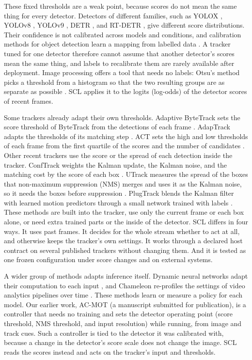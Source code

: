 \documentclass[pdflatex,referee,sn-mathphys-num]{sn-jnl}
\newcommand{\scl}{SCL}
\begin{document}
These fixed thresholds are a weak point, because scores do not mean the same
thing for every detector. Detectors of different families, such as YOLOX
\cite{ge2021yolox}, YOLOv8 \cite{jocher2023yolov8}, YOLOv9
\cite{wang2024yolov9}, DETR \cite{carion2020detr}, and RT-DETR
\cite{zhao2024rtdetr}, give different score distributions. Their confidence
is not calibrated across models and conditions, and calibration methods for
object detection learn a mapping from labelled data
\cite{kuppers2020detcalib}. A tracker tuned for one detector therefore cannot
assume that another detector's scores mean the same thing, and labels to
recalibrate them are rarely available after deployment. Image processing
offers a tool that needs no labels: Otsu's method picks a threshold from a
histogram so that the two resulting groups are as separate as possible
\cite{otsu1979}. \scl{} applies it to the logits (log-odds) of the detector
scores of recent frames.

Some trackers already adapt their own thresholds. Adaptive ByteTrack sets the
score threshold of ByteTrack from the detections of each frame
\cite{ma2023adaptivebytetrack}. AdapTrack adapts the thresholds of its
matching step \cite{shim2024adaptrack}. ACT sets the high and low thresholds
of each frame from the first quartile of the scores and the number of
candidates \cite{act2026adaptive}. Other recent trackers use the score or the
spread of each detection inside the tracker. ConfTrack weights the Kalman
update, the Kalman noise, and the matching cost by the score of each box
\cite{jung2024conftrack}. UTrack measures the spread of the boxes that
non-maximum suppression (NMS) merges and uses it as the Kalman noise, so it needs the
boxes before suppression \cite{solano2025utrack}. PlugTrack blends the Kalman
filter with learned motion predictors through a small network trained with
labels \cite{kim2026plugtrack}. These methods are built into the tracker, use
only the current frame or each box alone, or need extra trained parts or the
inside of the detector. \scl{} differs in four ways. It uses past
frames. It decides for the whole stream whether to act at all, and otherwise
keeps the tracker's own settings. It works through a declared host contract
on several published trackers without changing them. And it is tested as one
frozen configuration under score changes and on external systems.

A wider group of methods adapts inference itself. Dynamic neural networks
adapt their computation to each input \cite{han2022dynamic}, and Chameleon
re-profiles the settings of video analytics pipelines over time
\cite{jiang2018chameleon}. These methods learn or measure a policy for each
model. Our earlier work, AC-MOT (a manuscript submitted for publication), is a controller that
needs no training and sets the detector operating point (score threshold,
NMS threshold, and input resolution) while running, from image and track
cues. Such a controller is tied to the detector it was calibrated with,
because a change in the detector's score scale does not change the image.
\scl{} reads the scores instead and acts on the tracker's input and
thresholds.
\end{document}
